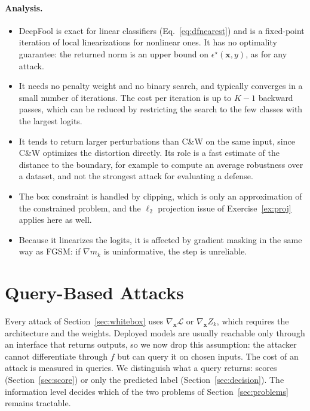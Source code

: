 \documentclass[10pt,a4paper]{extarticle}
\theoremstyle{definition}
\newcommand{\Loss}{\mathcal{L}}
\newcommand{\x}{\mathbf{x}}
\begin{document}
\paragraph{Analysis.}
\begin{itemize}
  \item DeepFool is exact for linear classifiers (Eq.~\ref{eq:dfnearest}) and is a fixed-point iteration of local linearizations for nonlinear ones. It has no optimality guarantee: the returned norm is an upper bound on \(\epsilon^\star(\x,y)\), as for any attack.
  \item It needs no penalty weight and no binary search, and typically converges in a small number of iterations. The cost per iteration is up to \(K-1\) backward passes, which can be reduced by restricting the search to the few classes with the largest logits.
  \item It tends to return larger perturbations than C\&W on the same input, since C\&W optimizes the distortion directly. Its role is a fast estimate of the distance to the boundary, for example to compute an average robustness over a dataset, and not the strongest attack for evaluating a defense.
  \item The box constraint is handled by clipping, which is only an approximation of the constrained problem, and the \(\ell_2\) projection issue of Exercise~\ref{ex:proj} applies here as well.
  \item Because it linearizes the logits, it is affected by gradient masking in the same way as FGSM: if \(\nabla m_k\) is uninformative, the step is unreliable.
\end{itemize}

\section{Query-Based Attacks}\label{sec:query}

Every attack of Section~\ref{sec:whitebox} uses \(\nabla_{\x}\Loss\) or \(\nabla_{\x}Z_k\), which requires the architecture and the weights. Deployed models are usually reachable only through an interface that returns outputs, so we now drop this assumption: the attacker cannot differentiate through \(f\) but can query it on chosen inputs. The cost of an attack is measured in queries. We distinguish what a query returns: scores (Section~\ref{sec:score}) or only the predicted label (Section~\ref{sec:decision}). The information level decides which of the two problems of Section~\ref{sec:problems} remains tractable.
\end{document}

